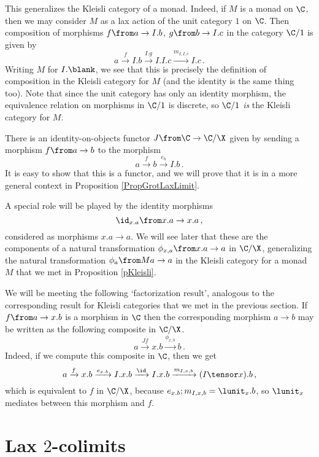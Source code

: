 \begin{remark}
  This generalizes the Kleisli category of a monad.  
  Indeed, if $M$ is a monad on $\C$, then we may consider $M$ as a lax action of the unit category $1$ on $\C$.
  Then composition of morphisms $f \from a \to I.b$, $g \from b \to I.c$ in the category $\C/1$ is given by
  \[
    a \xrightarrow{f}
    I.b \xrightarrow{I.g}
    I.I.c \xrightarrow{m_{I,I,c}}
    I.c\,.
    \]
  Writing $M$ for $I.\blank$, we see that this is precisely the definition of composition in the Kleisli category for $M$ (and the identity is the same thing too).  
  Note that since the unit category has only an identity morphism, the equivalence relation on morphisms in $\C/1$ is discrete, so $\C/1$ \emph{is} the Kleisli category for $M$.
\end{remark}

There is an identity-on-objects functor $J \from \C \to \C/\X$ given by sending a morphism $f \from a \to b$ to the \Mellies morphism
\[
  a \xrightarrow{f}
  b \xrightarrow{e_b}
  I.b\,.
  \]
It is easy to show that this is a functor, and we will prove that it is in a more general context in Proposition \ref{PropGrotLaxLimit}.

A special role will be played by the identity morphisms
\[
  \id_{x.a} \from x.a \to x.a\,,
  \]
considered as \Mellies morphisms $x.a \to a$.  
We will see later that these are the components of a natural transformation $\phi_{x,a}\from x.a \to a$ in $\C/\X$, generalizing the natural transformation $\phi_a \from Ma \to a$ in the Kleisli category for a monad $M$ that we met in Proposition \ref{pKleisli}.

We will be meeting the following `factorization result', analogous to the corresponding result for Kleisli categories that we met in the previous section.
If $f \from a \to x.b$ is a morphism in $\C$ then the corresponding \Mellies morphism $a \to b$ may be written as the following composite in $\C/\X$.
\[
  a \xrightarrow{Jf}
  x.b \xrightarrow{\phi_{x,b}}
  b\,.
  \]
Indeed, if we compute this composite in $\C$, then we get
\[
  a \xrightarrow{f}
  x.b \xrightarrow{e_{x.b}}
  I.x.b \xrightarrow{\id}
  I.x.b \xrightarrow{m_{I,x,b}}
  (I\tensor x).b\,,
  \]
which is equivalent to $f$ in $\C/\X$, because $e_{x.b};m_{I,x,b}=\lunit_x.b$, so $\lunit_x$ mediates between this morphism and $f$.

\section{Lax $2$-colimits}

